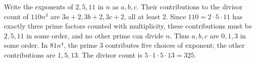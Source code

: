 Write the exponents of $2,5,11$ in $n$ as $a,b,c$. Their contributions to the divisor count of $110n^3$ are $3a+2,3b+2,3c+2$, all at least $2$. Since $110=2\cdot5\cdot11$ has exactly three prime factors counted with multiplicity, these contributions must be $2,5,11$ in some order, and no other prime can divide $n$. Thus $a,b,c$ are $0,1,3$ in some order. In $81n^4$, the prime $3$ contributes five choices of exponent; the other contributions are $1,5,13$. The divisor count is $5\cdot1\cdot5\cdot13=\boxed{325}$.
